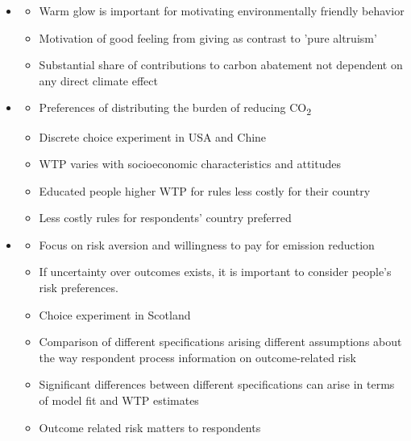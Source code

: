 \documentclass{beamer}              %
\begin{document}
\begin{frame}\label{Previous research2}
\begin{itemize}
\small
 
 \item \cite{Braaten2014}
\begin{itemize}
 \item Warm glow is important for motivating environmentally friendly behavior
 \item Motivation of good feeling from giving as contrast to 'pure altruism'
 \item Substantial share of contributions to carbon abatement not dependent on any direct climate effect
 \end{itemize} 

 
  \item \cite{Carlsson2013}
\begin{itemize}
\item Preferences of distributing the burden of reducing CO\textsubscript{2}
\item Discrete choice experiment in USA and Chine
\item WTP varies with socioeconomic characteristics and attitudes
\item Educated people higher WTP for rules less costly for their country
\item Less costly rules for respondents' country preferred
 \end{itemize}

  \end{itemize} 
  \end{frame}





\begin{frame}\label{Previous research3}
\begin{itemize}
\small
 \item \cite{GlenkColombo2013}
\begin{itemize}
 \item Focus on risk aversion and willingness to pay for emission reduction 
 \item If uncertainty over outcomes exists, it is important to consider people’s risk preferences.
  \item Choice experiment in Scotland 
   \item Comparison of different specifications arising different assumptions about the way respondent process information on outcome-related risk
   \item Significant differences between different specifications can arise in terms of model fit and WTP estimates
   \item Outcome related risk matters to respondents
 \end{itemize}
  \end{itemize}
  \end{frame}
 
\end{document}

